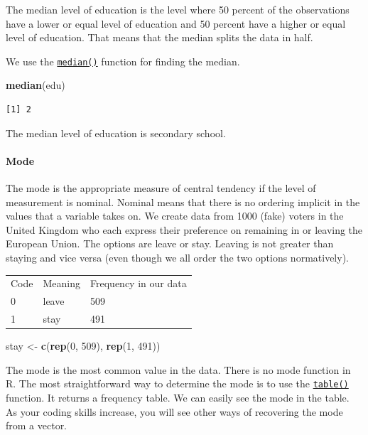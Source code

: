 \documentclass[]{article}
\newenvironment{Shaded}{\begin{snugshade}}{\end{snugshade}}
\newcommand{\DecValTok}[1]{\textcolor[rgb]{0.00,0.00,0.81}{#1}}
\newcommand{\KeywordTok}[1]{\textcolor[rgb]{0.13,0.29,0.53}{\textbf{#1}}}
\newcommand{\NormalTok}[1]{#1}
\newcommand{\StringTok}[1]{\textcolor[rgb]{0.31,0.60,0.02}{#1}}
\let\oldparagraph\paragraph
\renewcommand{\paragraph}[1]{\oldparagraph{#1}\mbox{}}
\begin{document}
The median level of education is the level where 50 percent of the observations have a lower or equal level of education and 50 percent have a higher or equal level of education. That means that the median splits the data in half.

We use the \href{http://bit.ly/R_median}{\texttt{median()}} function for finding the median.

\begin{Shaded}
\begin{Highlighting}[]
\KeywordTok{median}\NormalTok{(edu)}
\end{Highlighting}
\end{Shaded}

\begin{verbatim}
[1] 2
\end{verbatim}

The median level of education is secondary school.

\hypertarget{mode}{%
\paragraph{Mode}\label{mode}}

The mode is the appropriate measure of central tendency if the level of measurement is nominal. Nominal means that there is no ordering implicit in the values that a variable takes on. We create data from 1000 (fake) voters in the United Kingdom who each express their preference on remaining in or leaving the European Union. The options are leave or stay. Leaving is not greater than staying and vice versa (even though we all order the two options normatively).

\begin{longtable}[]{@{}lll@{}}
\toprule
\endhead
Code & Meaning & Frequency in our data\tabularnewline
0 & leave & 509\tabularnewline
1 & stay & 491\tabularnewline
\bottomrule
\end{longtable}

\begin{Shaded}
\begin{Highlighting}[]
\NormalTok{stay <-}\StringTok{ }\KeywordTok{c}\NormalTok{(}\KeywordTok{rep}\NormalTok{(}\DecValTok{0}\NormalTok{, }\DecValTok{509}\NormalTok{), }\KeywordTok{rep}\NormalTok{(}\DecValTok{1}\NormalTok{, }\DecValTok{491}\NormalTok{))}
\end{Highlighting}
\end{Shaded}

The mode is the most common value in the data. There is no mode function in R. The most straightforward way to determine the mode is to use the \href{http://bit.ly/R_table}{\texttt{table()}} function. It returns a frequency table. We can easily see the mode in the table. As your coding skills increase, you will see other ways of recovering the mode from a vector.
\end{document}
